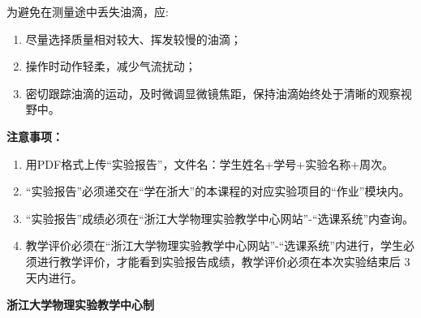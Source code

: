 \documentclass[10pt,a4paper]{ctexart}
\newcommand{\myspace}[1]{\par\vspace{#1\baselineskip}} %
\newcommand{\sihao}{\fontsize{14pt}{18pt}\selectfont}
\newcommand{\xiaosi}{\fontsize{12pt}{16pt}\selectfont}
\begin{document}
\vspace{2mm}
为避免在测量途中丢失油滴，应:
\begin{enumerate}
    \item 尽量选择质量相对较大、挥发较慢的油滴；
    \item 操作时动作轻柔，减少气流扰动；
    \item 密切跟踪油滴的运动，及时微调显微镜焦距，保持油滴始终处于清晰的观察视野中。
\end{enumerate}

\myspace{2}
\sihao\textbf{注意事项：}
\xiaosi
\begin{enumerate}
    \item 用PDF格式上传“实验报告”，文件名：学生姓名+学号+实验名称+周次。
    \item  “实验报告”必须递交在“学在浙大”的本课程的对应实验项目的“作业”模块内。
    \item  “实验报告”成绩必须在“浙江大学物理实验教学中心网站”-“选课系统”内查询。
    \item 教学评价必须在“浙江大学物理实验教学中心网站”-“选课系统”内进行，学生必须进行教学评价，才能看到实验报告成绩，教学评价必须在本次实验结束后 3 天内进行。
\end{enumerate}

\vspace{1cm}
\xiaosi\centering \textbf{浙江大学物理实验教学中心制}
\end{document}
